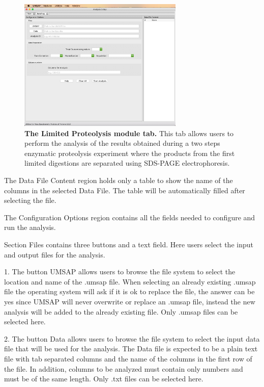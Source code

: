 \begin{figure}[h]
    \centering
    \includegraphics[width=0.7\textwidth]{./IMAGES/MOD-LIMPROT/limprot-mod.jpg}
    \caption[The Limited Proteolysis module tab]{\textbf{The Limited Proteolysis
    module tab.} This tab allows users to perform the analysis of the results obtained
    during a two steps enzymatic proteolysis experiment where the products from the
    first limited digestions are separated using SDS-PAGE electrophoresis.}
    \label{fig:limprotTab}
    \vspace{-5pt}
\end{figure}

The Data File Content region holds only a table to show the name of the columns in
the selected Data File. The table will be automatically filled after selecting the
file.

The Configuration Options region contains all the fields needed to configure and
run the analysis.

Section Files contains three buttons and a text field. Here users select the input
and output files for the analysis.

\num{1}. The button UMSAP allows users to browse the file system to select the location
and name of the .umsap file. When selecting an already existing .umsap file the operating
system will ask if it is ok to replace the file, the answer can be yes since UMSAP
will never overwrite or replace an .umsap file, instead the new analysis will be
added to the already existing file. Only .umsap files can be selected here.

\num{2}. The button Data allows users to browse the file system to select the input
data file that will be used for the analysis. The Data file is expected to be a
plain text file with tab separated columns and the name of the columns in the first
row of the file. In addition, columns to be analyzed must contain only numbers and
must be of the same length. Only .txt files can be selected here.


